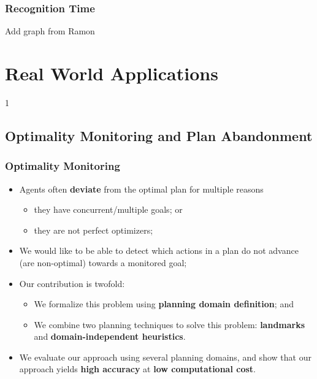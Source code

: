 \documentclass{beamer}
\newcommand{\todo}[1]{ {\color{red} #1} }
\def\masterclass{1}
\begin{document}
\begin{frame}[c]\frametitle{Recognition Time}
	\todo{Add graph from Ramon}
\end{frame}

\fi


\section{Real World Applications}

\if\masterclass1
\subsection{Optimality Monitoring and Plan Abandonment}
\begin{frame}[c]\frametitle{Optimality Monitoring}
   	\begin{itemize}
   		\item Agents often \textbf{deviate} from the optimal plan for multiple reasons
		\begin{itemize}
			\item they have concurrent/multiple goals; or 
			\item they are not perfect optimizers;
		\end{itemize}
		\item We would like to be able to detect which actions in a plan do not advance (are non-optimal) towards a monitored goal;
		\item Our contribution is twofold:
			\begin{itemize}
				\item We formalize this problem using \textbf{planning domain definition}; and
				\item We combine two planning techniques to solve this problem: \textbf{landmarks} and \textbf{domain-independent heuristics}.
			\end{itemize}
		\item We evaluate our approach using several planning domains, and show that our approach yields \textbf{high accuracy} at \textbf{low computational cost}.
	\end{itemize}
\end{frame}

\end{document}

